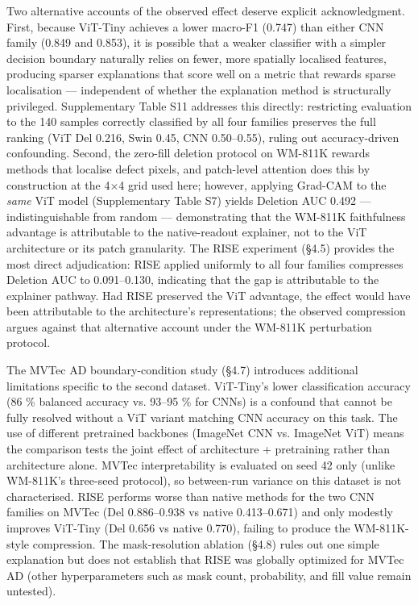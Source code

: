 \documentclass[11pt,a4paper]{article}
\begin{document}
Two alternative accounts of the observed effect deserve explicit acknowledgment. First, because ViT-Tiny achieves a lower macro-F1 (0.747) than either CNN family (0.849 and 0.853), it is possible that a weaker classifier with a simpler decision boundary naturally relies on fewer, more spatially localised features, producing sparser explanations that score well on a metric that rewards sparse localisation --- independent of whether the explanation method is structurally privileged. Supplementary Table S11 addresses this directly: restricting evaluation to the 140 samples correctly classified by all four families preserves the full ranking (ViT Del 0.216, Swin 0.45, CNN 0.50--0.55), ruling out accuracy-driven confounding. Second, the zero-fill deletion protocol on WM-811K rewards methods that localise defect pixels, and patch-level attention does this by construction at the 4$\times$4 grid
used here; however, applying Grad-CAM to the \emph{same} ViT model (Supplementary Table S7) yields Deletion AUC 0.492 --- indistinguishable from random --- demonstrating that the WM-811K faithfulness advantage is attributable to the native-readout explainer, not to the ViT architecture or its patch granularity. The RISE experiment (\S{}4.5) provides the most direct adjudication: RISE applied uniformly to all four families compresses Deletion AUC to 0.091--0.130, indicating that the gap is attributable to the explainer pathway. Had RISE preserved the ViT advantage, the effect would have been attributable to the architecture's representations; the observed compression argues against that alternative account under the WM-811K perturbation protocol.

The MVTec AD boundary-condition study (\S{}4.7) introduces additional limitations specific to the second dataset. ViT-Tiny's lower classification accuracy (86 \% balanced accuracy vs. 93--95 \% for CNNs) is a confound that cannot be fully resolved without a ViT variant matching CNN accuracy on this task. The use of different pretrained backbones (ImageNet CNN vs. ImageNet ViT) means the comparison tests the joint effect of architecture + pretraining rather than architecture alone. MVTec interpretability is evaluated on seed 42 only (unlike WM-811K's three-seed protocol), so between-run variance on this dataset is not characterised. RISE performs worse than native methods for the two CNN families on MVTec (Del 0.886--0.938 vs native 0.413--0.671) and only modestly improves ViT-Tiny (Del 0.656 vs native 0.770), failing to produce the WM-811K-style compression. The mask-resolution ablation
(\S{}4.8) rules out one simple explanation but does not establish that RISE was globally optimized for MVTec AD (other hyperparameters such as mask count, probability, and fill value remain untested).
\end{document}
